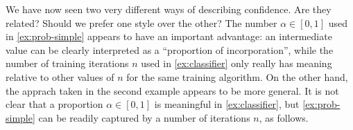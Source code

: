 %
%
We have now seen two very different ways of describing confidence. 
Are they related? 
Should we prefer one style over the other?
The number $\alpha \in [0,1]$ used in \cref{ex:prob-simple}
appears to have an important advantage: an intermediate value can be clearly interpreted as a ``proportion of incorporation'', while the number of training iterations $n$ used in
\cref{ex:classifier} only really has meaning relative to
other values of $n$ for the same training algorithm.
%
On the other hand,
the apprach taken in the second example
appears to be more general. 
It is not clear that a proportion $\alpha \in [0,1]$ 
is meaningful in \cref{ex:classifier},
but \cref{ex:prob-simple} can be
readily captured by a number of iterations 
$n$, as follows.
% 
%
